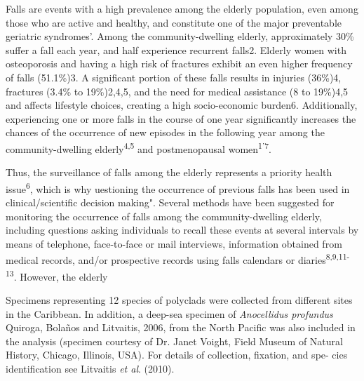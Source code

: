 \begin{multicols}{2}
\par{}Falls are events with a high prevalence among the elderly population, even among those who are active and healthy, and constitute one of the major preventable geriatric syndromes'. Among the community-dwelling elderly, approximately 30\% suffer a fall each year, and half experience recurrent falls2. Elderly women with osteoporosis and having a high risk of fractures exhibit an even higher frequency of falls (51.1\%)3. A significant portion of these falls results in injuries (36\%)4, fractures (3.4\% to 19\%)2,4,5, and the need for medical assistance (8 to 19\%)4,5 and affects lifestyle choices, creating a high socio-economic burden6. Additionally, experiencing one or more falls in the course of one year significantly increases the chances of the occurrence of new episodes in the following year among the community-dwelling elderly\textsuperscript{4,5} and postmenopausal women\textsuperscript{1'7}.
\par{}Thus, the surveillance of falls among the elderly represents a priority health issue\textsuperscript{6},  which is why uestioning the occurrence of previous falls has been used in clinical/scientific decision making". Several methods have been suggested for monitoring the occurrence of falls among the community-dwelling elderly, including questions asking individuals to recall these events at several intervals by means of telephone, face-to-face or mail interviews, information obtained from medical records, and/or prospective records using falls calendars or diaries\textsuperscript{8,9,11-13}. However, the elderly\\

\lipsum



\par{}Specimens representing 12 species of polyclads were
collected from different sites in the Caribbean. In addition,
a deep-sea specimen of \textit{Anocellidus profundus} Quiroga,
Bolaños and Litvaitis, 2006, from the North Pacific was
also included in the analysis (specimen courtesy of Dr.
Janet Voight, Field Museum of Natural History, Chicago,
Illinois, USA). For details of collection, fixation, and spe-
cies identification see Litvaitis \textit{et al}. (2010).


\end{multicols}

